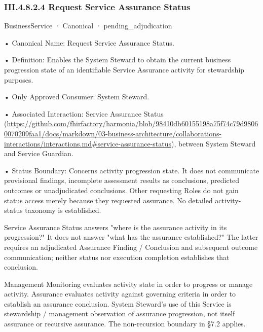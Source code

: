 \subsubsection*{III.4.8.2.4 Request Service Assurance Status}
\label{navigation:III.4.8.2.4}

\label{element:60f8cbc814614f669f31d4e78734c6d6}
{\small BusinessService · Canonical · pending\_adjudication}\par

•
Canonical Name: Request Service Assurance Status.



•
Definition: Enables the System Steward to obtain the current business progression state of an identifiable Service Assurance activity for stewardship purposes.



•
Only Approved Consumer: System Steward.



•
Associated Interaction: Service Assurance Status (\url{https://github.com/fhirfactory/harmonia/blob/98410db60155198a75f74c79d98060070209faa1/docs/markdown/03-business-architecture/collaborations-interactions/interactions.md#service-assurance-status}), between System Steward and Service Guardian.



•
Status Boundary: Concerns activity progression state. It does not communicate provisional findings, incomplete assessment results as conclusions, predicted outcomes or unadjudicated conclusions. Other requesting Roles do not gain status access merely because they requested assurance. No detailed activity-status taxonomy is established.



Service Assurance Status answers "where is the assurance activity in its progression?" It does not answer "what has the assurance established?" The latter requires an adjudicated Assurance Finding / Conclusion and subsequent outcome communication; neither status nor execution completion establishes that conclusion.



Management Monitoring evaluates activity state in order to progress or manage activity. Assurance evaluates activity against governing criteria in order to establish an assurance conclusion. System Steward's use of this Service is stewardship / management observation of assurance progression, not itself assurance or recursive assurance. The non-recursion boundary in §7.2 applies.



